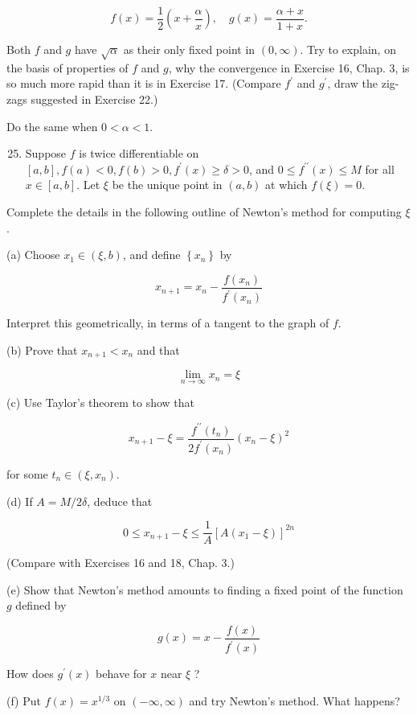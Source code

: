 \documentclass[10pt]{article}
\begin{document}
$$
f(x)=\frac{1}{2}\left(x+\frac{\alpha}{x}\right), \quad g(x)=\frac{\alpha+x}{1+x} .
$$

Both $f$ and $g$ have $\sqrt{\alpha}$ as their only fixed point in $(0, \infty)$. Try to explain, on the basis of properties of $f$ and $g$, why the convergence in Exercise 16, Chap. 3, is so much more rapid than it is in Exercise 17. (Compare $f^{\prime}$ and $g^{\prime}$, draw the zig-zags suggested in Exercise 22.)

Do the same when $0<\alpha<1$.

\begin{enumerate}
  \setcounter{enumi}{24}
  \item Suppose $f$ is twice differentiable on $[a, b], f(a)<0, f(b)>0, f^{\prime}(x) \geq \delta>0$, and $0 \leq f^{\prime \prime}(x) \leq M$ for all $x \in[a, b]$. Let $\xi$ be the unique point in $(a, b)$ at which $f(\xi)=0$.
\end{enumerate}

Complete the details in the following outline of Newton's method for computing $\xi$.

(a) Choose $x_{1} \in(\xi, b)$, and define $\left\{x_{n}\right\}$ by

$$
x_{n+1}=x_{n}-\frac{f\left(x_{n}\right)}{f^{\prime}\left(x_{n}\right)}
$$

Interpret this geometrically, in terms of a tangent to the graph of $f$.

(b) Prove that $x_{n+1}<x_{n}$ and that

$$
\lim _{n \rightarrow \infty} x_{n}=\xi
$$

(c) Use Taylor's theorem to show that

$$
x_{n+1}-\xi=\frac{f^{\prime \prime}\left(t_{n}\right)}{2 f^{\prime}\left(x_{n}\right)}\left(x_{n}-\xi\right)^{2}
$$

for some $t_{n} \in\left(\xi, x_{n}\right)$.

(d) If $A=M / 2 \delta$, deduce that

$$
0 \leq x_{n+1}-\xi \leq \frac{1}{A}\left[A\left(x_{1}-\xi\right)\right]^{2 n}
$$

(Compare with Exercises 16 and 18, Chap. 3.)

(e) Show that Newton's method amounts to finding a fixed point of the function $g$ defined by

$$
g(x)=x-\frac{f(x)}{f^{\prime}(x)}
$$

How does $g^{\prime}(x)$ behave for $x$ near $\xi$ ?

(f) Put $f(x)=x^{1 / 3}$ on $(-\infty, \infty)$ and try Newton's method. What happens?
\end{document}
